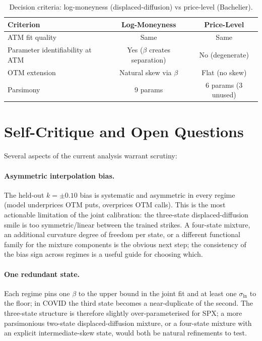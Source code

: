 \documentclass[12pt]{article}
\begin{document}
\begin{table}[htbp]
\centering
\caption{Decision criteria: log-moneyness (displaced-diffusion) vs price-level (Bachelier).}
\label{tab:decision}
\small
\begin{tabular}{lcc}
\toprule
Criterion & Log-Moneyness & Price-Level \\
\midrule
ATM fit quality & Same & Same \\
Parameter identifiability at ATM & Yes ($\beta$ creates separation) & No (degenerate) \\
OTM extension & Natural skew via $\beta$ & Flat (no skew) \\
Parsimony & 9 params & 6 params (3 unused) \\
\bottomrule
\end{tabular}
\end{table}


\section{Self-Critique and Open Questions}
\label{sec:critique}

Several aspects of the current analysis warrant scrutiny:

\paragraph{Asymmetric interpolation bias.} The held-out $k=\pm 0.10$ bias is systematic and asymmetric in every regime (model underprices OTM puts, overprices OTM calls). This is the most actionable limitation of the joint calibration: the three-state displaced-diffusion smile is too symmetric/linear between the trained strikes. A four-state mixture, an additional curvature degree of freedom per state, or a different functional family for the mixture components is the obvious next step; the consistency of the bias sign across regimes is a useful guide for choosing which.

\paragraph{One redundant state.} Each regime pins one $\beta$ to the upper bound in the joint fit and at least one $\sigma_{\ln}$ to the floor; in COVID the third state becomes a near-duplicate of the second. The three-state structure is therefore slightly over-parameterised for SPX; a more parsimonious two-state displaced-diffusion mixture, or a four-state mixture with an explicit intermediate-skew state, would both be natural refinements to test.
\end{document}

